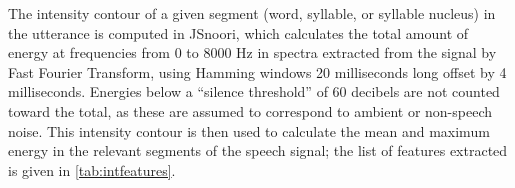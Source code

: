 	The intensity contour of a given segment (word, syllable, or syllable nucleus) in the utterance is computed in JSnoori, which calculates the total amount of energy at frequencies from 0 to 8000 Hz in spectra extracted from the signal by Fast Fourier Transform, using Hamming windows 20 milliseconds long offset by 4 milliseconds.
	Energies below a ``silence threshold'' of 60 decibels are not counted toward the total, as these are assumed to correspond to ambient or non-speech noise.  
	This intensity contour is then used to calculate the mean and maximum energy in the relevant segments of the speech signal; the list of features extracted is given in \cref{tab:intfeatures}.
	
	
	
